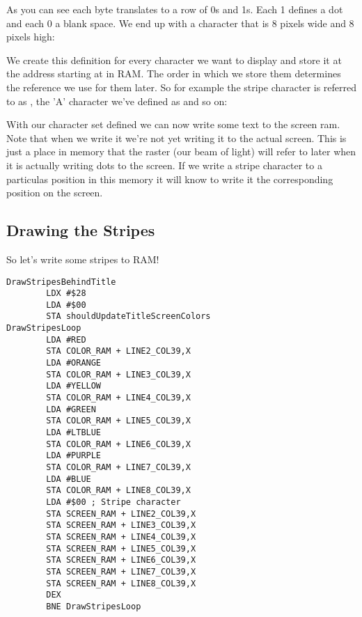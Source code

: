 As you can see each byte translates to a row of 0s and 1s. Each 1 defines a dot and each 0 a blank space. We end up
with a character that is 8 pixels wide and 8 pixels high:



We create this definition for every character we want to display and store it at the address starting at 
in RAM. The order in which we store them determines the reference we use for them later. So for example the stripe
character is referred to as , the 'A' character we've defined as  and so on:



With our character set defined we can now write some text to the screen ram. Note that when we write it 
we're not yet writing it to the actual screen. This is just a place in memory that the raster (our beam of light)
will refer to later when it is actually writing dots to the screen. If we write a stripe character to a particulas position
in this  memory it will know to write it the corresponding position on the screen.

\subsection{Drawing the Stripes}
So let's write some stripes to RAM!

\begin{lstlisting}[caption=The 'stripe' character.]
DrawStripesBehindTitle
        LDX #$28
        LDA #$00
        STA shouldUpdateTitleScreenColors
DrawStripesLoop   
        LDA #RED
        STA COLOR_RAM + LINE2_COL39,X
        LDA #ORANGE
        STA COLOR_RAM + LINE3_COL39,X
        LDA #YELLOW
        STA COLOR_RAM + LINE4_COL39,X
        LDA #GREEN
        STA COLOR_RAM + LINE5_COL39,X
        LDA #LTBLUE
        STA COLOR_RAM + LINE6_COL39,X
        LDA #PURPLE
        STA COLOR_RAM + LINE7_COL39,X
        LDA #BLUE
        STA COLOR_RAM + LINE8_COL39,X
        LDA #$00 ; Stripe character
        STA SCREEN_RAM + LINE2_COL39,X
        STA SCREEN_RAM + LINE3_COL39,X
        STA SCREEN_RAM + LINE4_COL39,X
        STA SCREEN_RAM + LINE5_COL39,X
        STA SCREEN_RAM + LINE6_COL39,X
        STA SCREEN_RAM + LINE7_COL39,X
        STA SCREEN_RAM + LINE8_COL39,X
        DEX
        BNE DrawStripesLoop

\end{lstlisting}

